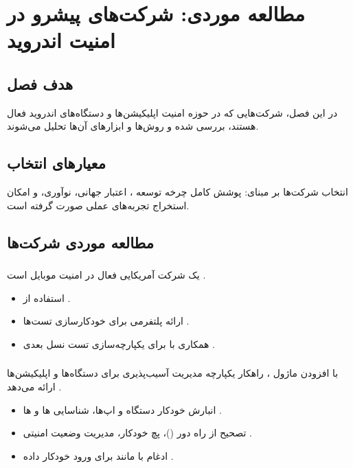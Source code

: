 \clearpage
\thispagestyle{empty}

\chapter{مطالعه موردی: شرکت‌های پیشرو در امنیت اندروید}\label{chap3}

\section{هدف فصل}
در این فصل، شرکت‌هایی که در حوزه امنیت اپلیکیشن‌ها و دستگاه‌های اندروید فعال هستند، بررسی شده و روش‌ها و ابزارهای آن‌ها تحلیل می‌شوند.

\section{معیارهای انتخاب}
انتخاب شرکت‌ها بر مبنای: پوشش کامل چرخه توسعه ، اعتبار جهانی، نوآوری، و امکان استخراج تجربه‌های عملی صورت گرفته است.

\section{مطالعه موردی شرکت‌ها}

\subsection{}
 یک شرکت آمریکایی فعال در امنیت موبایل است \cite{nowsecure2024}.
\begin{itemize}
  \renewcommand{\labelitemi}{\lr{$\bullet$}}
  \item استفاده از  \cite{nowsecure2024platform}.
  \item ارائه پلتفرمی برای خودکارسازی تست‌ها  \cite{nowsecure2024automation}.
  \item همکاری با  برای یکپارچه‌سازی تست نسل بعدی \cite{nowsecure2024synopsys}.
\end{itemize}

\subsection{}
 با افزودن ماژول ، راهکار یکپارچه مدیریت آسیب‌پذیری برای دستگاه‌ها و اپلیکیشن‌ها ارائه می‌دهد \cite{qualys2024vmdr}.
\begin{itemize}
  \renewcommand{\labelitemi}{\lr{$\bullet$}}
  \item انبارش خودکار دستگاه و اپ‌ها، شناسایی ها و ها \cite{qualys2024inventory}.
  \item تصحیح از راه دور ()، پچ خودکار، مدیریت وضعیت امنیتی \cite{qualys2024patching}.
  \item ادغام با  مانند  برای ورود خودکار داده \cite{qualys2024mdm}.
\end{itemize}

